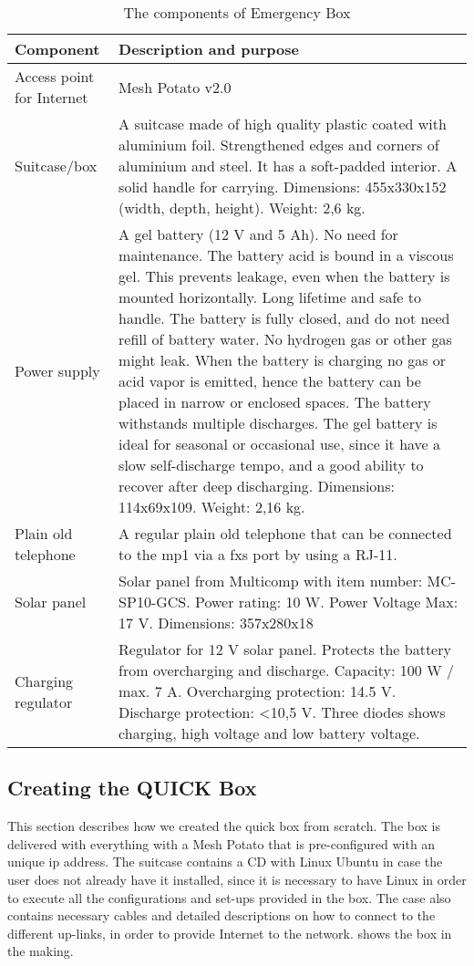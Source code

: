 \begin{center}
\begin{table}[t]
\caption{\label{tab:components}The components of Emergency Box}
    \begin{tabular}{ | l | p{9cm} |}
    \hline
    \textbf{Component} & \textbf{Description and purpose} \\ 
    \hline
    Access point for Internet &  Mesh Potato v2.0\\ 
    \hline
    Suitcase/box &  A suitcase made of high quality plastic coated with aluminium foil. Strengthened edges and corners of aluminium and steel. It has a soft-padded interior. A solid handle for carrying. Dimensions: 455x330x152 (width, depth, height). Weight: 2,6 kg. \\ 
    \hline
    Power supply & A gel battery (12 V and 5 Ah). No need for maintenance. The battery acid is bound in a viscous gel. This prevents leakage, even when the battery is mounted horizontally. Long lifetime and safe to handle. The battery is fully closed, and do not need refill of battery water. No hydrogen gas or other gas might leak. When the battery is charging no gas or acid vapor is emitted, hence the battery can be placed in narrow or enclosed spaces. The battery withstands multiple discharges. The gel battery is ideal for seasonal or occasional use, since it have a slow self-discharge tempo, and a good ability to recover after deep discharging. Dimensions: 114x69x109. Weight: 2,16 kg. \\
    \hline
    Plain old telephone &  A regular plain old telephone that can be connected to the \gls{mp1} via a \gls{fxs} port by using a RJ-11. \\
	\hline
	Solar panel & Solar panel from Multicomp with item number: MC-SP10-GCS. Power rating: 10 W. Power Voltage Max: 17 V. Dimensions: 357x280x18\\
	\hline
	Charging regulator & Regulator for 12 V solar panel. Protects the battery from overcharging and discharge. Capacity: 100 W / max. 7 A. Overcharging protection: 14.5 V. Discharge protection: <10,5 V. Three diodes shows charging, high voltage and low battery voltage. \\
	\hline
    \end{tabular}
   \end{table}
\end{center}

\clearpage

\subsection{Creating the QUICK Box}
This section describes how we created the \gls{quick} box from scratch. The box is delivered with everything with a Mesh Potato that is pre-configured with an unique \gls{ip} address. The suitcase contains a CD with Linux Ubuntu in case the user does not already have it installed, since it is necessary to have Linux in order to execute all the configurations and set-ups provided in the box. The case also contains necessary cables and detailed descriptions on how to connect to the different up-links, in order to provide Internet to the network.  shows the box in the making.


